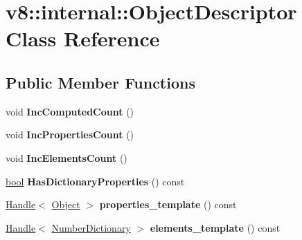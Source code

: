 \hypertarget{classv8_1_1internal_1_1ObjectDescriptor}{}\section{v8\+:\+:internal\+:\+:Object\+Descriptor Class Reference}
\label{classv8_1_1internal_1_1ObjectDescriptor}
\subsection*{Public Member Functions}
\begin{DoxyCompactItemize}
\item 
\mbox{\label{classv8_1_1internal_1_1ObjectDescriptor_a4343e2eb7d8328e8c2ef9ae4c857dc20}} 
void {\bfseries Inc\+Computed\+Count} ()
\item 
\mbox{\label{classv8_1_1internal_1_1ObjectDescriptor_a7927c9ab1253449bd55a0a88758f3bf6}} 
void {\bfseries Inc\+Properties\+Count} ()
\item 
\mbox{\label{classv8_1_1internal_1_1ObjectDescriptor_a2d13ed6f017312dc11b6b70004885462}} 
void {\bfseries Inc\+Elements\+Count} ()
\item 
\mbox{\label{classv8_1_1internal_1_1ObjectDescriptor_adb84128cc8051890413f401a18053137}} 
\mbox{\hyperlink{classbool}{bool}} {\bfseries Has\+Dictionary\+Properties} () const
\item 
\mbox{\label{classv8_1_1internal_1_1ObjectDescriptor_a954a003b5eb7361e80e922a151ed7a5a}} 
\mbox{\hyperlink{classv8_1_1internal_1_1Handle}{Handle}}$<$ \mbox{\hyperlink{classv8_1_1internal_1_1Object}{Object}} $>$ {\bfseries properties\+\_\+template} () const
\item 
\mbox{\label{classv8_1_1internal_1_1ObjectDescriptor_ae148cbd0c8700791a740fee9dd3eafd0}} 
\mbox{\hyperlink{classv8_1_1internal_1_1Handle}{Handle}}$<$ \mbox{\hyperlink{classv8_1_1internal_1_1NumberDictionary}{Number\+Dictionary}} $>$ {\bfseries elements\+\_\+template} () const
\item 

\end{DoxyCompactItemize}
